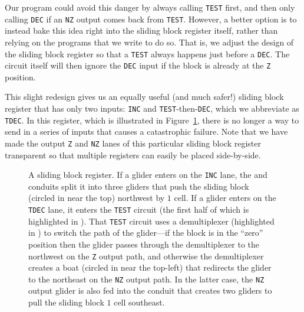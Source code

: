 Our program could avoid this danger by always calling \texttt{TEST} first, and then only calling \texttt{DEC} if an \texttt{NZ} output comes back from \texttt{TEST}. However, a better option is to instead bake this idea right into the sliding block register itself, rather than relying on the programs that we write to do so. That is, we adjust the design of the sliding block register so that a \texttt{TEST} always happens just before a \texttt{DEC}. The circuit itself will then ignore the \texttt{DEC} input if the block is already at the \texttt{Z} position.

This slight redesign gives us an equally useful (and much safer!) sliding block register that has only two inputs: \texttt{INC} and \texttt{TEST}-then-\texttt{DEC}, which we abbreviate as \texttt{TDEC}. In this register, which is illustrated in Figure~\ref{fig:sliding_block_register}, there is no longer a way to send in a series of inputs that causes a catastrophic failure. Note that we have made the output \texttt{Z} and \texttt{NZ} lanes of this particular sliding block register transparent so that multiple registers can easily be placed side-by-side.

\begin{figure}[!htb]
	\centering
	\caption{A sliding block register. If a glider enters on the \texttt{INC} lane, the  and  conduits split it into three gliders that push the sliding block (circled in  near the top) northwest by $1$ cell. If a glider enters on the \texttt{TDEC} lane, it enters the \texttt{TEST} circuit (the first half of which is highlighted in ). That \texttt{TEST} circuit uses a demultiplexer (highlighted in ) to switch the path of the glider---if the block is in the ``zero'' position then the glider passes through the demultiplexer to the northwest on the \texttt{Z} output path, and otherwise the demultiplexer creates a boat (circled in  near the top-left) that redirects the glider to the northeast on the \texttt{NZ} output path. In the latter case, the \texttt{NZ} output glider is also fed into the  conduit that creates two gliders to pull the sliding block $1$ cell southeast.}\label{fig:sliding_block_register}
\end{figure}


